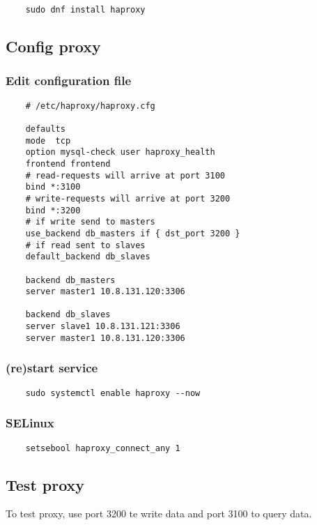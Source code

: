 \begin{lstlisting}
    sudo dnf install haproxy
\end{lstlisting}

\subsection{Config proxy}

\subsubsection{Edit configuration file}

\begin{lstlisting}
    # /etc/haproxy/haproxy.cfg
    
    defaults
    mode  tcp
    option mysql-check user haproxy_health
    frontend frontend
    # read-requests will arrive at port 3100
    bind *:3100
    # write-requests will arrive at port 3200
    bind *:3200
    # if write send to masters
    use_backend db_masters if { dst_port 3200 }
    # if read sent to slaves
    default_backend db_slaves
    
    backend db_masters
    server master1 10.8.131.120:3306
    
    backend db_slaves
    server slave1 10.8.131.121:3306
    server master1 10.8.131.120:3306
\end{lstlisting}

\subsubsection{(re)start service}

\begin{lstlisting}
    sudo systemctl enable haproxy --now
\end{lstlisting}

\subsubsection{SELinux}

\begin{lstlisting}
    setsebool haproxy_connect_any 1
\end{lstlisting}

\subsection{Test proxy}

To test proxy, use  port 3200 te write data and port 3100 to query data.